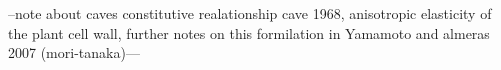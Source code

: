 --note about caves constitutive realationship cave 1968, anisotropic
elasticity of the plant cell wall,\cite{Cave_1968} further notes on this formilation in Yamamoto
and almeras 2007 (mori-tanaka)\cite{Yamamoto_2007}---